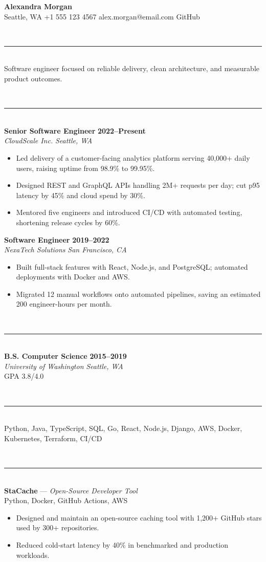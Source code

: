 \documentclass[10pt,letterpaper]{article}
\newcommand{\rsection}[1]{\vspace{9pt}{\large\bfseries #1}\\[-4pt]\rule{\linewidth}{0.5pt}\\[2pt]}
\begin{document}
\begin{center}{\LARGE\bfseries Alexandra Morgan}\\[3pt]
\small Seattle, WA \textbar{} +1 555 123 4567 \textbar{} alex.morgan@email.com \textbar{} GitHub\end{center}

\rsection{Summary}
\noindent Software engineer focused on reliable delivery, clean architecture, and measurable product outcomes.

\rsection{Experience}
\noindent\textbf{Senior Software Engineer} \hfill \textbf{2022--Present}\\
\textit{CloudScale Inc.} \hfill \textit{Seattle, WA}\\[2pt]
\begin{itemize}
\item Led delivery of a customer-facing analytics platform serving 40,000+ daily users, raising uptime from 98.9\% to 99.95\%.
\item Designed REST and GraphQL APIs handling 2M+ requests per day; cut p95 latency by 45\% and cloud spend by 30\%.
\item Mentored five engineers and introduced CI/CD with automated testing, shortening release cycles by 60\%.
\end{itemize}
\vspace{5pt}
\noindent\textbf{Software Engineer} \hfill \textbf{2019--2022}\\
\textit{NexaTech Solutions} \hfill \textit{San Francisco, CA}\\[2pt]
\begin{itemize}
\item Built full-stack features with React, Node.js, and PostgreSQL; automated deployments with Docker and AWS.
\item Migrated 12 manual workflows onto automated pipelines, saving an estimated 200 engineer-hours per month.
\end{itemize}

\rsection{Education}
\noindent\textbf{B.S. Computer Science} \hfill \textbf{2015--2019}\\
\textit{University of Washington} \hfill \textit{Seattle, WA}\\[2pt]
{\small GPA 3.8/4.0}

\rsection{Skills}
\noindent Python, Java, TypeScript, SQL, Go, React, Node.js, Django, AWS, Docker, Kubernetes, Terraform, CI/CD

\rsection{Projects}
\noindent\textbf{StaCache} --- \textit{Open-Source Developer Tool}\\[1pt]
{\small Python, Docker, GitHub Actions, AWS}
\begin{itemize}
\item Designed and maintain an open-source caching tool with 1,200+ GitHub stars used by 300+ repositories.
\item Reduced cold-start latency by 40\% in benchmarked and production workloads.
\end{itemize}
\end{document}

